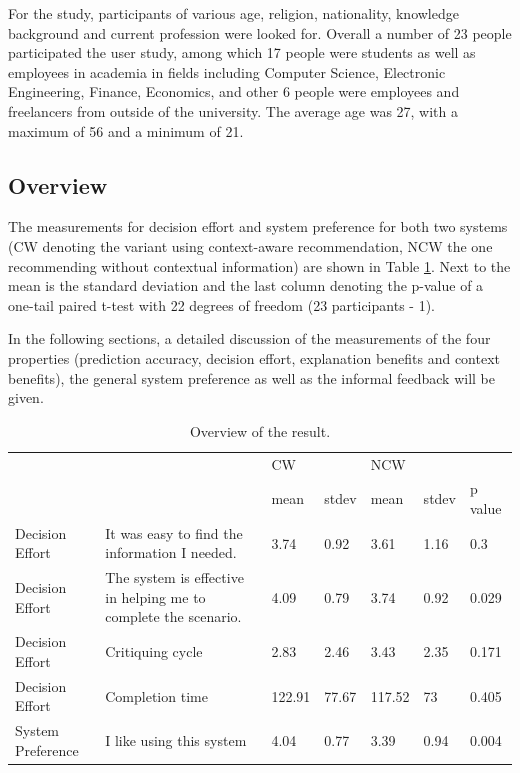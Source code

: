 For the study, participants of various age, religion, nationality, knowledge background and current profession were looked for. Overall a number of 23 people participated the user study, among which 17 people were students as well as employees in academia in fields including Computer Science, Electronic Engineering, Finance, Economics, and other 6 people were employees and freelancers from outside of the university. The average age was 27, with a maximum of 56 and a minimum of 21.

\subsection{Overview} \label{sec:results_o}

The measurements for decision effort and system preference for both two systems (CW denoting the variant using context-aware recommendation, NCW the one recommending without contextual information) are shown in Table \ref{tab:overview}. Next to the mean is the standard deviation and the last column denoting the p-value of a one-tail paired t-test with 22 degrees of freedom (23 participants - 1).

In the following sections, a detailed discussion of the measurements of the four properties (prediction accuracy, decision effort, explanation benefits and context benefits), the general system preference as well as the informal feedback will be given.

\begin{table}[H]
	\centering
	\caption{Overview of the result.}
	\label{tab:overview}
	\begin{tabular}{p{0.7in}p{1.2in}p{0.5in}p{0.5in}p{0.5in}p{0.5in}p{0.5in}}
	           \hline
		 &  & CW &  & NCW \\ 
 		 &  & mean & stdev & mean & stdev & p value \\ \hline
		 Decision Effort & It was easy to find the information I needed. & 3.74 & 0.92 & 3.61 & 1.16 & 0.3 \\ 
		Decision Effort & The system is effective in helping me to complete the scenario. & 4.09 & 0.79 & 3.74 & 0.92 & 0.029 \\ 
		Decision Effort & Critiquing cycle & 2.83 & 2.46 & 3.43 & 2.35 & 0.171 \\ 
		Decision Effort & Completion time & 122.91 & 77.67 & 117.52 & 73 & 0.405 \\ 
		System Preference & I like using this system & 4.04 & 0.77 & 3.39 & 0.94 & 0.004 \\ \hline
	\end{tabular}
\end{table}

